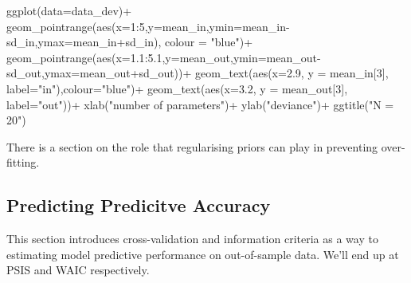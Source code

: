 \documentclass[
]{book}
\newenvironment{Shaded}{\begin{snugshade}}{\end{snugshade}}
\newcommand{\AttributeTok}[1]{\textcolor[rgb]{0.77,0.63,0.00}{#1}}
\newcommand{\DecValTok}[1]{\textcolor[rgb]{0.00,0.00,0.81}{#1}}
\newcommand{\FloatTok}[1]{\textcolor[rgb]{0.00,0.00,0.81}{#1}}
\newcommand{\FunctionTok}[1]{\textcolor[rgb]{0.00,0.00,0.00}{#1}}
\newcommand{\NormalTok}[1]{#1}
\newcommand{\SpecialCharTok}[1]{\textcolor[rgb]{0.00,0.00,0.00}{#1}}
\newcommand{\StringTok}[1]{\textcolor[rgb]{0.31,0.60,0.02}{#1}}
\begin{document}
\begin{Shaded}
\begin{Highlighting}[]
\FunctionTok{ggplot}\NormalTok{(}\AttributeTok{data=}\NormalTok{data\_dev)}\SpecialCharTok{+}
  \FunctionTok{geom\_pointrange}\NormalTok{(}\FunctionTok{aes}\NormalTok{(}\AttributeTok{x=}\DecValTok{1}\SpecialCharTok{:}\DecValTok{5}\NormalTok{,}\AttributeTok{y=}\NormalTok{mean\_in,}\AttributeTok{ymin=}\NormalTok{mean\_in}\SpecialCharTok{{-}}\NormalTok{sd\_in,}\AttributeTok{ymax=}\NormalTok{mean\_in}\SpecialCharTok{+}\NormalTok{sd\_in), }\AttributeTok{colour =} \StringTok{"blue"}\NormalTok{)}\SpecialCharTok{+}
  \FunctionTok{geom\_pointrange}\NormalTok{(}\FunctionTok{aes}\NormalTok{(}\AttributeTok{x=}\FloatTok{1.1}\SpecialCharTok{:}\FloatTok{5.1}\NormalTok{,}\AttributeTok{y=}\NormalTok{mean\_out,}\AttributeTok{ymin=}\NormalTok{mean\_out}\SpecialCharTok{{-}}\NormalTok{sd\_out,}\AttributeTok{ymax=}\NormalTok{mean\_out}\SpecialCharTok{+}\NormalTok{sd\_out))}\SpecialCharTok{+}
  \FunctionTok{geom\_text}\NormalTok{(}\FunctionTok{aes}\NormalTok{(}\AttributeTok{x=}\FloatTok{2.9}\NormalTok{, }\AttributeTok{y =}\NormalTok{ mean\_in[}\DecValTok{3}\NormalTok{], }\AttributeTok{label=}\StringTok{"in"}\NormalTok{),}\AttributeTok{colour=}\StringTok{"blue"}\NormalTok{)}\SpecialCharTok{+}
  \FunctionTok{geom\_text}\NormalTok{(}\FunctionTok{aes}\NormalTok{(}\AttributeTok{x=}\FloatTok{3.2}\NormalTok{, }\AttributeTok{y =}\NormalTok{ mean\_out[}\DecValTok{3}\NormalTok{], }\AttributeTok{label=}\StringTok{"out"}\NormalTok{))}\SpecialCharTok{+}
  \FunctionTok{xlab}\NormalTok{(}\StringTok{"number of parameters"}\NormalTok{)}\SpecialCharTok{+}
  \FunctionTok{ylab}\NormalTok{(}\StringTok{"deviance"}\NormalTok{)}\SpecialCharTok{+}
  \FunctionTok{ggtitle}\NormalTok{(}\StringTok{"N = 20"}\NormalTok{)}
\end{Highlighting}
\end{Shaded}

There is a section on the role that regularising priors can play in preventing over-fitting.

\hypertarget{predicting-predicitve-accuracy}{%
\subsection*{Predicting Predicitve Accuracy}\label{predicting-predicitve-accuracy}}

This section introduces cross-validation and information criteria as a way to estimating model predictive performance on out-of-sample data. We'll end up at PSIS and WAIC respectively.
\end{document}
